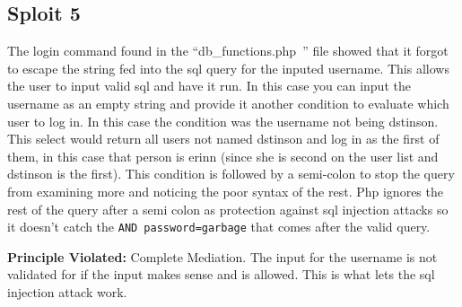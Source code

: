 \documentclass{article}
\begin{document}
	\subsection*{Sploit 5} %
	\label{sub:sploit_5}
	The login command found in the ``db\_functions.php~'' file showed that it forgot to escape the string fed into the sql query for the inputed username. This allows the user to input valid sql and have it run. In this case you can input the username as an empty string and provide it another condition to evaluate which user to log in. In this case the condition was the username not being dstinson. This select would return all users not named dstinson and log in as the first of them, in this case that person is erinn (since she is second on the user list and dstinson is the first). This condition is followed by a semi-colon to stop the query from examining more and noticing the poor syntax of the rest. Php ignores the rest of the query after a semi colon as protection against sql injection attacks so it doesn't catch the \texttt{AND password=garbage} that comes after the valid query.

	\textbf{Principle Violated: }Complete Mediation. The input for the username is not validated for if the input makes sense and is allowed. This is what lets the sql injection attack work.

\end{document}
